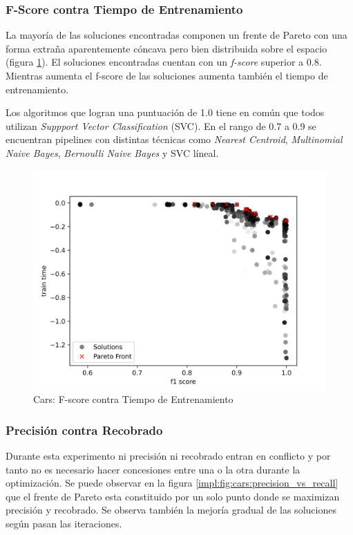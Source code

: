 \subsubsection{F-Score contra Tiempo de Entrenamiento}
La mayor\'ia de las soluciones encontradas componen un frente de Pareto con una forma extra\~na aparentemente c\'oncava pero bien distribuida sobre el espacio (figura \ref{impl:fig:cars:fscore_vs_time}).  El soluciones encontradas cuentan con un \textit{f-score} superior a 0.8. Mientras aumenta el f-score de las soluciones aumenta tambi\'en el tiempo de entrenamiento.

Los algoritmos que logran una puntuaci\'on de 1.0 tiene en com\'un que todos utilizan \textit{Suppport Vector Classification} (SVC). En el rango de 0.7 a 0.9 se encuentran pipelines con distintas t\'ecnicas como \textit{Nearest Centroid}, \textit{Multinomial Naive Bayes}, \textit{Bernoulli Naive Bayes} y SVC l\'ineal.

\begin{figure}[ht]
    \centering
    \includegraphics[scale=0.65]{Pictures/cars_fscore_vs_time.jpg}
    \caption{Cars: F-score contra Tiempo de Entrenamiento}
    \label{impl:fig:cars:fscore_vs_time}
\end{figure}


\subsubsection{Precisi\'on contra Recobrado}
Durante esta experimento  ni precisi\'on ni recobrado entran en conflicto y por tanto no es necesario hacer concesiones entre una o la otra durante la optimizaci\'on. Se puede observar en la figura \ref{impl:fig:cars:precision_vs_recall} que el frente de Pareto esta constituido por un solo punto donde se maximizan precisi\'on y recobrado. Se observa tambi\'en la mejor\'ia gradual de las soluciones seg\'un pasan las iteraciones. 

